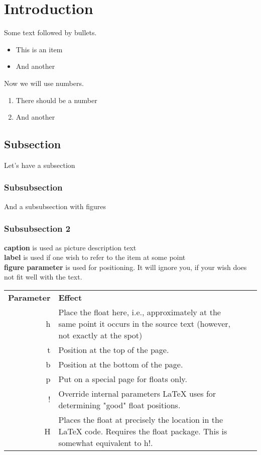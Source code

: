 \section{Introduction}
Some text followed by bullets.
\begin{itemize}
\item This is an item
\item And another
\end{itemize}
Now we will use numbers.
\begin{enumerate}
\item There should be a number
\item And another
\end{enumerate}
\subsection{Subsection}
Let's have a subsection
\subsubsection{Subsubsection}
And a subsubsection with figures
\begin{comment}
\begin{figure}[H]
  \texttt{[image: illustrations/UseCase\_ver1.png]}
  \caption{Usecase version 1.1}
  \label{dailyscrum}
\end{figure}
\begin{figure}[H]
  \texttt{[image: illustrations/UseCase\_ver2.png]}
  \caption{Usecase version 2.0}
  \label{burndown}
\end{figure}
\end{comment}
\subsubsection{Subsubsection 2}
\textbf{caption} is used as picture description text\\
\textbf{label} is used if one wish to refer to the item at some point\\
\textbf{figure parameter} is used for positioning. It will ignore you, if your wish does not fit well with the text.\\
\begin{table*}[h!]\centering
  \begin{tabularx}{\textwidth}{@{}rXXl@{}}\toprule
    \textbf{Parameter} & \textbf{Effect}\\
    h & Place the float here, i.e., approximately at the same point it occurs in the source text (however, not exactly at the spot)\\
    t & Position at the top of the page.\\
    b & Position at the bottom of the page.\\
    p & Put on a special page for floats only.\\
    ! & Override internal parameters LaTeX uses for determining "good" float positions.\\
    H & Places the float at precisely the location in the LaTeX code. Requires the float package. This is somewhat equivalent to h!.\\
	\bottomrule
  \end{tabularx}
\end{table*}
\newpage